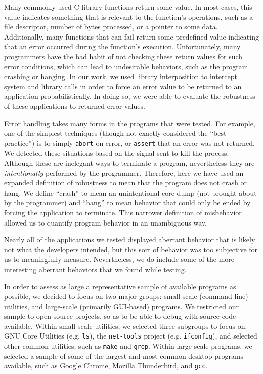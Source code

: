 Many commonly used C library functions return some value. In most cases, this value indicates something that is relevant to the  function's operations, such as a file descriptor, number of bytes processed, or a pointer to some data. Additionally, many functions that can fail return some predefined value indicating that an error occurred during the function's execution. Unfortunately, many programmers have the bad habit of not checking these return values for such error conditions, which can lead to undesirable behaviors, such as the program crashing or hanging. In our work, we used library interposition to intercept system and library calls in order to force an error value to be returned to an application probabilistically. In doing so, we were able to evaluate the robustness of these applications to returned error values.

Error handling takes many forms in the programs that were tested. For example, one of the simplest techniques (though not exactly considered the ``best practice'') is to simply \texttt{abort} on error, or \texttt{assert} that an error was not returned. We detected these situations based on the signal sent to kill the process. Although these are inelegant ways to terminate a program, nevertheless they are \emph{intentionally} performed by the programmer. Therefore, here we have used an expanded definition of robustness to mean that the program does not crash or hang. We define ``crash'' to mean an unintentional core dump (not brought about by the programmer) and ``hang'' to mean behavior that could only be ended by forcing the application to terminate. This narrower definition of misbehavior allowed us to quantify program behavior in an unambiguous way.

Nearly all of the applications we tested displayed aberrant behavior that is likely not what the developers intended, but this sort of behavior was too subjective for us to meaningfully measure. Nevertheless, we do include some of the more interesting aberrant behaviors that we found while testing.

In order to assess as large a representative sample of available programs as possible, we decided to focus on two major groups: small-scale (command-line) utilities, and large-scale (primarily GUI-based) programs. We restricted our sample to open-source projects, so as to be able to debug with source code available. Within small-scale utilities, we selected three subgroups to focus on: GNU Core Utilities (e.g. \texttt{ls}), the \texttt{net-tools} project (e.g. \texttt{ifconfig}), and selected other common utilities, such as \texttt{make} and \texttt{grep}. Within large-scale programs, we selected a sample of some of the largest and most common desktop programs available, such as Google Chrome, Mozilla Thunderbird, and \texttt{gcc}.
